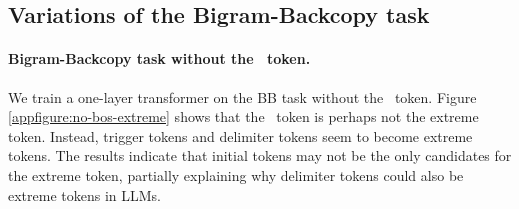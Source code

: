 \subsection{Variations of the Bigram-Backcopy task}

\paragraph{Bigram-Backcopy task without the \bos~token.} We train a one-layer transformer on the BB task without the \bos~token. Figure \ref{appfigure:no-bos-extreme} shows that the \bos~token is perhaps not the extreme token. Instead, trigger tokens and delimiter tokens seem to become extreme tokens. The results indicate that initial tokens may not be the only candidates for the extreme token, partially explaining why delimiter tokens could also be extreme tokens in LLMs.
